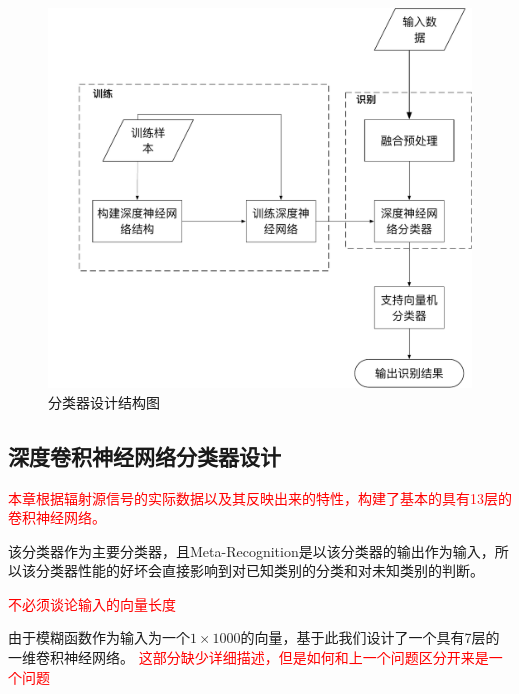 \begin{figure}
	\centering
	\includegraphics[width=\textwidth]{figures/frame_emitter.pdf}
	\caption{分类器设计结构图}
\end{figure}


\subsection{深度卷积神经网络分类器设计}
\textcolor{red}{本章根据辐射源信号的实际数据以及其反映出来的特性，构建了基本的具有\textcolor{red}{13}层的卷积神经网络。
}

该分类器作为主要分类器，且Meta-Recognition是以该分类器的输出作为输入，所以该分类器性能的好坏会直接影响到对已知类别的分类和对未知类别的判断。

\textcolor{red}{不必须谈论输入的向量长度}

由于模糊函数作为输入为一个$1 \times 1000$的向量，基于此我们设计了一个具有7层的一维卷积神经网络。
\textcolor{red}{这部分缺少详细描述，但是如何和上一个问题区分开来是一个问题}

